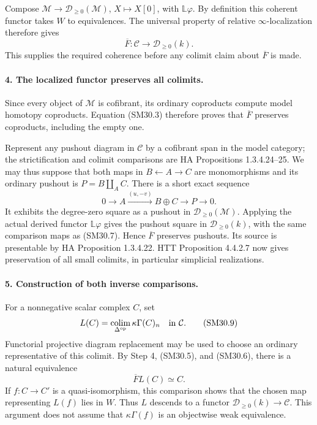 \documentclass[11pt,a4paper]{article}
\theoremstyle{definition}\newtheorem{definition}[theorem]{Definition}
\theoremstyle{remark}\newtheorem{remark}[theorem]{Remark}
\begin{document}
Compose \(\mathcal M\to\mathcal D_{\ge0}(\mathcal M)\),
\(X\mapsto X[0]\), with \(\mathbb L\varphi\).
By definition this coherent functor takes \(W\) to
equivalences.  The universal property of relative
\(\infty\)-localization therefore gives
\[
 \overline F:\mathcal C\longrightarrow\mathcal D_{\ge0}(k).
                                                               \tag{SM30.7}
\]
This supplies the required coherence before any colimit claim
about \(\overline F\) is made.

\paragraph{4. The localized functor preserves all colimits.}
Since every object of \(\mathcal M\) is cofibrant, its ordinary
coproducts compute model homotopy coproducts.  Equation (SM30.3)
therefore proves that \(\overline F\) preserves coproducts,
including the empty one.

Represent any pushout diagram in \(\mathcal C\) by a
cofibrant span in the model category; the strictification and
colimit comparisons are HA Propositions 1.3.4.24--25.
We may thus suppose that both maps in
\(B\leftarrow A\to C\) are monomorphisms and its ordinary
pushout is \(P=B\amalg_A C\).  There is a short exact sequence
\[
 0\longrightarrow A\xrightarrow{(u,-v)}B\oplus C
                     \longrightarrow P\longrightarrow0.
                                                               \tag{SM30.8}
\]
It exhibits the degree-zero square as a pushout in
\(\mathcal D_{\ge0}(\mathcal M)\).  Applying the actual
derived functor \(\mathbb L\varphi\) gives the pushout
square in \(\mathcal D_{\ge0}(k)\), with the same comparison
maps as (SM30.7).  Hence \(\overline F\) preserves pushouts.
Its source is presentable by HA Proposition 1.3.4.22.
HTT Proposition 4.4.2.7 now gives preservation of all small
colimits, in particular simplicial realizations.

\paragraph{5. Construction of both inverse comparisons.}
For a nonnegative scalar complex \(C\), set
\[
 L(C)=\operatorname*{colim}_{\Delta^{\rm op}}
                        \kappa\Gamma(C)_n\quad\text{in }\mathcal C.
                                                               \tag{SM30.9}
\]
Functorial projective diagram replacement may be used to choose
an ordinary representative of this colimit.  By Step 4,
(SM30.5), and (SM30.6), there is a natural equivalence
\[
                      \overline F L(C)\simeq C.            \tag{SM30.10}
\]
If \(f:C\to C'\) is a quasi-isomorphism, this comparison
shows that the chosen map representing \(L(f)\) lies in \(W\).
Thus \(L\) descends to a functor
\(\mathcal D_{\ge0}(k)\to\mathcal C\).
This argument does not assume that \(\kappa\Gamma(f)\)
is an objectwise weak equivalence.
\end{document}
